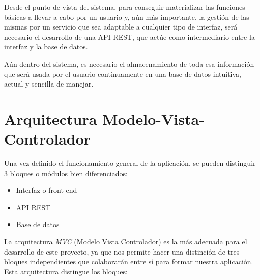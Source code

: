 Desde el punto de vista del sistema, para conseguir materializar las funciones básicas a llevar a cabo por un usuario y, aún más importante, la gestión de las mismas por un servicio que sea adaptable a cualquier tipo de interfaz, será necesario el desarrollo de una API REST, que actúe como intermediario entre la interfaz y la base de datos.

Aún dentro del sistema, es necesario el almacenamiento de toda esa información que será usada por el usuario continuamente en una base de datos intuitiva, actual y sencilla de manejar.


\section{Arquitectura Modelo-Vista-Controlador}
\label{sec::arquitecturaMVC}
Una vez definido el funcionamiento general de la aplicación, se pueden distinguir 3 bloques o módulos bien diferenciados:

\begin{itemize}
    \item Interfaz o front-end
    \item API REST
    \item Base de datos
\end{itemize}
 
 La arquitectura \textit{MVC} (Modelo Vista Controlador) es la más adecuada para el desarrollo de este proyecto, ya que nos permite hacer una distinción de tres bloques independientes que colaborarán entre sí para formar nuestra aplicación\cite{mvc2}\cite{mvc3}. Esta arquitectura distingue los bloques\cite{mvc1}:
 
